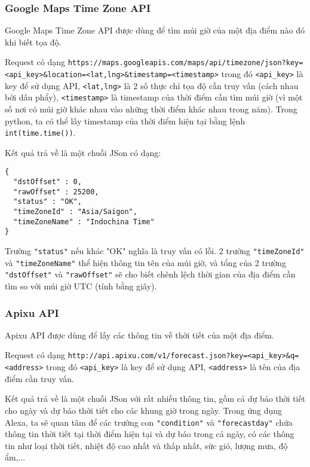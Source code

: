 \subsubsection{Google Maps Time Zone API}

Google Maps Time Zone API được dùng để tìm múi giờ của một địa điểm nào đó khi biết tọa độ.

Request có dạng \lstinline{https://maps.googleapis.com/maps/api/timezone/json?key=<api_key>&location=<lat,lng>&timestamp=<timestamp>} trong đó \lstinline{<api_key>} là key để sử dụng API, \lstinline{<lat,lng>} là 2 số thực chỉ tọa độ cần truy vấn (cách nhau bởi dấu phẩy), \lstinline{<timestamp>} là timestamp của thời điểm cần tìm múi giờ (vì một số nơi có múi giờ khác nhau vào những thời điểm khác nhau trong năm). Trong python, ta có thể lấy timestamp của thời điểm hiện tại bằng lệnh \lstinline{int(time.time())}.

Kết quả trả về là một chuỗi JSon có dạng:

\begin{lstlisting}
{
  "dstOffset" : 0,
  "rawOffset" : 25200,
  "status" : "OK",
  "timeZoneId" : "Asia/Saigon",
  "timeZoneName" : "Indochina Time"
}
\end{lstlisting}

Trường \lstinline{"status"} nếu khác "OK" nghĩa là truy vấn có lỗi. 2 trường \lstinline{"timeZoneId"} và \lstinline{"timeZoneName"} thể hiện thông tin tên của múi giờ, và tổng của 2 trường \lstinline{"dstOffset"} và \lstinline{"rawOffset"} sẽ cho biết chênh lệch thời gian của địa điểm cần tìm so với múi giờ UTC (tính bằng giây).

\subsubsection{Apixu API}

Apixu API được dùng để lấy các thông tin về thời tiết của một địa điểm.

Request có dạng \lstinline{http://api.apixu.com/v1/forecast.json?key=<api_key>&q=<address>} trong đó \lstinline{<api_key>} là key để sử dụng API, \lstinline{<address>} là tên của địa điểm cần truy vấn.

Kết quả trả về là một chuỗi JSon với rất nhiều thông tin, gồm cả dự báo thời tiết cho ngày và dự báo thời tiết cho các khung giờ trong ngày. Trong ứng dụng Alexa, ta sẽ quan tâm để các trường con \lstinline{"condition"} và \lstinline{"forecastday"} chứa thông tin thời tiết tại thời điểm hiện tại và dự báo trong cả ngày, có các thông tin như loại thời tiết, nhiệt độ cao nhất và thấp nhất, sức gió, lượng mưa, độ ẩm,...

